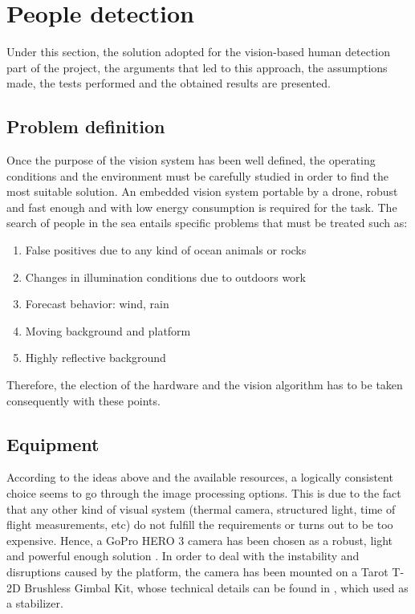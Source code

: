 \chapter{People detection}
Under this section, the solution adopted for the vision-based human detection part of the project, the arguments that led to this approach, the assumptions made, the tests performed and the obtained results are presented. 

\section{Problem definition}
Once the purpose of the vision system has been well defined, the operating conditions and the environment must be carefully studied in order to find the most suitable solution.
An embedded vision system portable by a drone, robust and fast enough and with low energy consumption is required for the task. 
The search of people in the sea entails specific problems that must be treated such as:

\begin{enumerate}[itemsep=1mm,topsep=1mm,leftmargin=.35in]
    \item False positives due to any kind of ocean animals or rocks
    \item Changes in illumination conditions due to outdoors work
    \item Forecast behavior: wind, rain
    \item Moving background and platform
    \item Highly reflective background
\end{enumerate}%

Therefore, the election of the hardware and the vision algorithm has to be taken consequently with these points.

\section{Equipment}
According to the ideas above and the available resources, a logically consistent choice seems to go through the image processing options. 
This is due to the fact that any other kind of visual system (thermal camera, structured light, time of flight measurements, etc) do not fulfill the requirements or turns out to be too expensive.
Hence, a GoPro HERO 3 camera has been chosen as a robust, light and powerful enough solution \cite{ref:HERO3}.
In order to deal with the instability and disruptions caused by the platform, the camera has been mounted on a Tarot T-2D Brushless Gimbal Kit, whose technical details can be found in \cite{Ref:Gimbal}, which used as a stabilizer.

